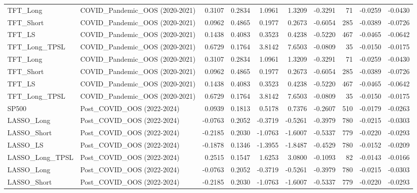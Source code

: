 \begin{tabular}{llrrrrrrrr}
\cline{1-10}
TFT\_Long & COVID\_Pandemic\_OOS (2020-2021) & 0.3107 & 0.2834 & 1.0961 & 1.3209 & -0.3291 & 71 & -0.0259 & -0.0430 \\
\cline{1-10}
TFT\_Short & COVID\_Pandemic\_OOS (2020-2021) & 0.0962 & 0.4865 & 0.1977 & 0.2673 & -0.6054 & 285 & -0.0389 & -0.0726 \\
\cline{1-10}
TFT\_LS & COVID\_Pandemic\_OOS (2020-2021) & 0.1438 & 0.4083 & 0.3523 & 0.4238 & -0.5220 & 467 & -0.0465 & -0.0642 \\
\cline{1-10}
TFT\_Long\_TPSL & COVID\_Pandemic\_OOS (2020-2021) & 0.6729 & 0.1764 & 3.8142 & 7.6503 & -0.0809 & 35 & -0.0150 & -0.0175 \\
\cline{1-10}
TFT\_Long & COVID\_Pandemic\_OOS (2020-2021) & 0.3107 & 0.2834 & 1.0961 & 1.3209 & -0.3291 & 71 & -0.0259 & -0.0430 \\
\cline{1-10}
TFT\_Short & COVID\_Pandemic\_OOS (2020-2021) & 0.0962 & 0.4865 & 0.1977 & 0.2673 & -0.6054 & 285 & -0.0389 & -0.0726 \\
\cline{1-10}
TFT\_LS & COVID\_Pandemic\_OOS (2020-2021) & 0.1438 & 0.4083 & 0.3523 & 0.4238 & -0.5220 & 467 & -0.0465 & -0.0642 \\
\cline{1-10}
TFT\_Long\_TPSL & COVID\_Pandemic\_OOS (2020-2021) & 0.6729 & 0.1764 & 3.8142 & 7.6503 & -0.0809 & 35 & -0.0150 & -0.0175 \\
\cline{1-10}
SP500 & Post\_COVID\_OOS (2022-2024) & 0.0939 & 0.1813 & 0.5178 & 0.7376 & -0.2607 & 510 & -0.0179 & -0.0263 \\
\cline{1-10}
LASSO\_Long & Post\_COVID\_OOS (2022-2024) & -0.0763 & 0.2052 & -0.3719 & -0.5261 & -0.3979 & 780 & -0.0215 & -0.0303 \\
\cline{1-10}
LASSO\_Short & Post\_COVID\_OOS (2022-2024) & -0.2185 & 0.2030 & -1.0763 & -1.6007 & -0.5337 & 779 & -0.0220 & -0.0293 \\
\cline{1-10}
LASSO\_LS & Post\_COVID\_OOS (2022-2024) & -0.1878 & 0.1346 & -1.3955 & -1.8487 & -0.4529 & 780 & -0.0152 & -0.0209 \\
\cline{1-10}
LASSO\_Long\_TPSL & Post\_COVID\_OOS (2022-2024) & 0.2515 & 0.1547 & 1.6253 & 3.0800 & -0.1093 & 82 & -0.0143 & -0.0166 \\
\cline{1-10}
LASSO\_Long & Post\_COVID\_OOS (2022-2024) & -0.0763 & 0.2052 & -0.3719 & -0.5261 & -0.3979 & 780 & -0.0215 & -0.0303 \\
\cline{1-10}
LASSO\_Short & Post\_COVID\_OOS (2022-2024) & -0.2185 & 0.2030 & -1.0763 & -1.6007 & -0.5337 & 779 & -0.0220 & -0.0293 \\

\end{tabular}
